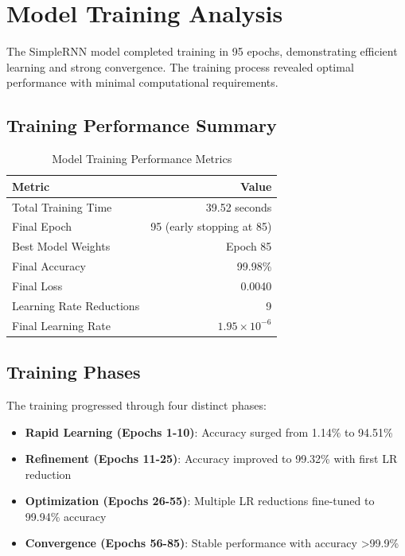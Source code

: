 \documentclass[12pt]{article}
\begin{document}
\section*{Model Training Analysis}
The SimpleRNN model completed training in 95 epochs, demonstrating efficient learning and strong convergence. The training process revealed optimal performance with minimal computational requirements.

\subsection*{Training Performance Summary}
\begin{table}[H]
\centering
\caption{Model Training Performance Metrics}
\label{tab:training_analysis}
\renewcommand{\arraystretch}{2} %
\setlength{\tabcolsep}{15pt} %
\begin{tabular}{|l|r|}
\hline
\textbf{Metric} & \textbf{Value} \\
\hline 
Total Training Time & 39.52 seconds \\
\hline
Final Epoch & 95 (early stopping at 85) \\
\hline
Best Model Weights & Epoch 85 \\
\hline
Final Accuracy & 99.98\% \\
\hline
Final Loss & 0.0040 \\
\hline
Learning Rate Reductions & 9 \\
\hline
Final Learning Rate & $1.95 \times 10^{-6}$ \\
\hline
\end{tabular}
\end{table}
\subsection*{Training Phases}
The training progressed through four distinct phases:

\begin{itemize}
    \item \textbf{Rapid Learning (Epochs 1-10)}: Accuracy surged from 1.14\% to 94.51\%
    \item \textbf{Refinement (Epochs 11-25)}: Accuracy improved to 99.32\% with first LR reduction
    \item \textbf{Optimization (Epochs 26-55)}: Multiple LR reductions fine-tuned to 99.94\% accuracy
    \item \textbf{Convergence (Epochs 56-85)}: Stable performance with accuracy >99.9\%
\end{itemize}
\end{document}
